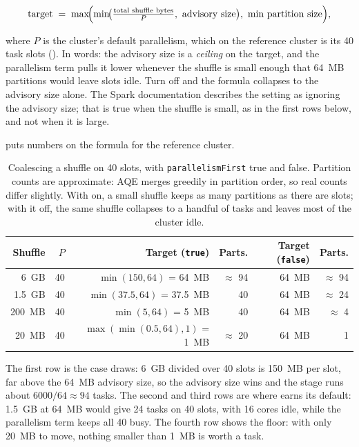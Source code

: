 \[
\text{target} \;=\; \max\!\Bigl(\min\!\bigl(\tfrac{\text{total shuffle bytes}}{P},\ \text{advisory size}\bigr),\ \text{min partition size}\Bigr),
\]

where $P$ is the cluster's default parallelism, which on the reference cluster
is its 40 task slots (). In words: the advisory size is a
\emph{ceiling} on the target, and the parallelism term pulls it lower whenever
the shuffle is small enough that 64~MB partitions would leave slots idle. Turn
 off and the formula collapses to the advisory size
alone. The Spark documentation describes the setting as ignoring the advisory
size; that is true when the shuffle is small, as in the first rows below, and
not when it is large.

 puts numbers on the formula for the reference
cluster.

\begin{table}[htbp]
\centering\footnotesize
\renewcommand{\arraystretch}{1.25}
\begin{tabular}{@{}rrrrrr@{}}
\toprule
\textbf{Shuffle} & $P$ & \textbf{Target (\texttt{true})} & \textbf{Parts.} & \textbf{Target (\texttt{false})} & \textbf{Parts.} \\
\midrule
6~GB    & 40 & $\min(150, 64)$ = 64~MB & $\approx$ 94 & 64~MB & $\approx$ 94 \\
1.5~GB  & 40 & $\min(37.5, 64)$ = 37.5~MB & 40 & 64~MB & $\approx$ 24 \\
200~MB  & 40 & $\min(5, 64)$ = 5~MB & 40 & 64~MB & $\approx$ 4 \\
20~MB   & 40 & $\max(\min(0.5, 64), 1)$ = 1~MB & $\approx$ 20 & 64~MB & 1 \\
\bottomrule
\end{tabular}
\caption{Coalescing a shuffle on 40 slots, with \texttt{parallelismFirst} true
and false. Partition counts are approximate: AQE merges greedily in partition
order, so real counts differ slightly. With  on, a small
shuffle keeps as many partitions as there are slots; with it off, the same
shuffle collapses to a handful of tasks and leaves most of the cluster idle.}
\label{tab:aqe-parallelism-first}
\end{table}

The first row is the case  draws: 6~GB divided over 40
slots is 150~MB per slot, far above the 64~MB advisory size, so the advisory
size wins and the stage runs about $6000 / 64 \approx 94$ tasks. The second and
third rows are where  earns its default: 1.5~GB at 64~MB
would give 24 tasks on 40 slots, with 16 cores idle, while the parallelism term
keeps all 40 busy. The fourth row shows the floor: with only 20~MB to move,
nothing smaller than 1~MB is worth a task.

